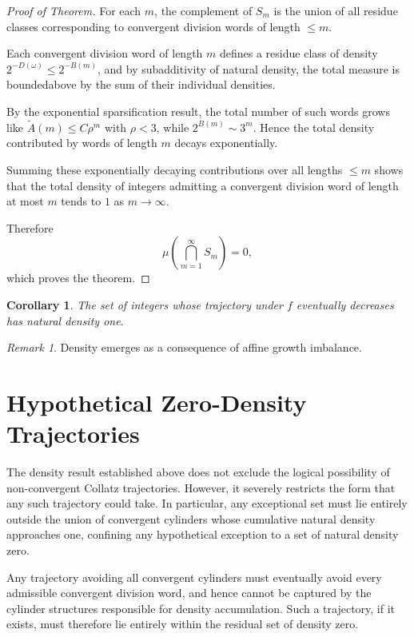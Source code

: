 \documentclass[12pt, oneside]{article}
\numberwithin{equation}{section}
\theoremstyle{definition}
\theoremstyle{plain}
\newtheorem{corollary}[theorem]{Corollary}
\theoremstyle{remark}
\newtheorem*{remark}{Remark}
\begin{document}
\begin{proof}[Proof of Theorem]
For each $m$, the complement of $S_m$ is the union of all residue classes
corresponding to convergent division words of length $\le m$.

Each convergent division word of length $m$ defines a residue class of
density $2^{-D(\omega)} \le 2^{-B(m)}$, and by subadditivity of natural density,
the total measure is boundedabove by the sum of their individual densities.

By the exponential sparsification result, the total number of such words
grows like $\widetilde A(m) \le C \rho^m$ with $\rho < 3$, while
$2^{B(m)} \sim 3^m$. Hence the total density contributed by words of length
$m$ decays exponentially.

Summing these exponentially decaying contributions over all lengths $\le m$
shows that the total density of integers admitting a convergent division word
of length at most $m$ tends to $1$ as $m \to \infty$.

Therefore
\[
\mu\!\left(\bigcap_{m=1}^\infty S_m\right) = 0,
\]
which proves the theorem.
\end{proof}

\begin{corollary}
The set of integers whose trajectory under $f$ eventually decreases
has natural density one.
\end{corollary}

\begin{remark}
Density emerges as a consequence of affine growth imbalance.
\end{remark}

\section{Hypothetical Zero-Density Trajectories}

The density result established above does not exclude the logical possibility of
non-convergent Collatz trajectories. However, it severely restricts the form that
any such trajectory could take. In particular, any exceptional set must lie entirely
outside the union of convergent cylinders whose cumulative natural density
approaches one, confining any hypothetical exception to a set of natural density zero.

Any trajectory avoiding all convergent cylinders must eventually avoid every
admissible convergent division word, and hence cannot be captured by the cylinder
structures responsible for density accumulation. Such a trajectory, if it exists,
must therefore lie entirely within the residual set of density zero.
\end{document}
